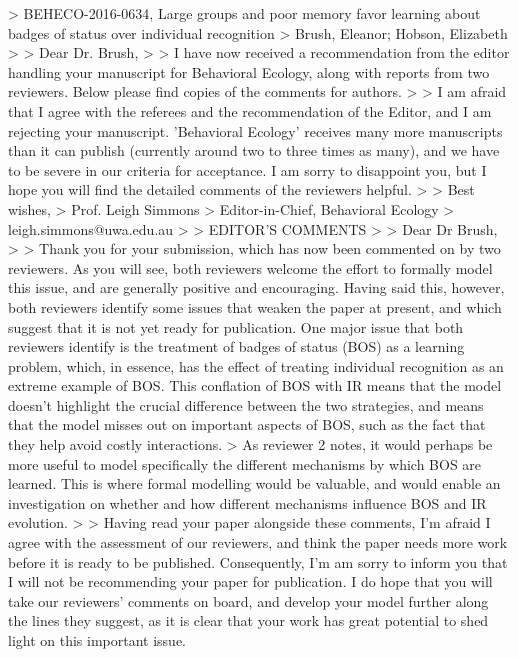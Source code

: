 


> BEHECO-2016-0634, Large groups and poor memory favor learning about badges of status over individual recognition
> Brush, Eleanor; Hobson, Elizabeth
>
> Dear Dr. Brush,
>
> I have now received a recommendation from the editor handling your manuscript for Behavioral Ecology, along with reports from two reviewers.  Below please find copies of the comments for authors.
>
> I am afraid that I agree with the referees and the recommendation of the Editor, and I am rejecting your manuscript.  'Behavioral Ecology' receives many more manuscripts than it can publish (currently around two to three times as many), and we have to be severe in our criteria for acceptance.  I am sorry to disappoint you, but I hope you will find the detailed comments of the reviewers helpful.
>
> Best wishes,
> Prof. Leigh Simmons
> Editor-in-Chief, Behavioral Ecology
> leigh.simmons@uwa.edu.au
>
> EDITOR'S COMMENTS
>
> Dear Dr Brush,
>
> Thank you for your submission, which has now been commented on by two reviewers. As you will see, both reviewers welcome the effort to formally model this issue, and are generally positive and encouraging. Having said this, however, both reviewers identify some issues that weaken the paper at present, and which suggest that it is not yet ready for publication. One major issue that both reviewers identify is the treatment of badges of status (BOS) as a learning problem, which, in essence, has the effect of treating individual recognition as an extreme example of BOS. This conflation of BOS with IR means that the model doesn't highlight the crucial difference between the two strategies, and means that the model misses out on important aspects of BOS, such as the fact that they help avoid costly interactions.
> As reviewer 2 notes, it would perhaps be more useful to model specifically the different mechanisms by which BOS are learned. This is where formal modelling would be valuable, and would enable an investigation on whether and how different mechanisms influence BOS and IR evolution.
>
> Having read your paper alongside these comments, I'm afraid I agree with the assessment of our reviewers, and think the paper needs more work before it is ready to be published. Consequently, I'm am sorry to inform you that I will not be recommending your paper for publication. I do hope that you will take our reviewers' comments on board, and develop your model further along the lines they suggest, as it is clear that your work has great potential to shed light on this important issue.
